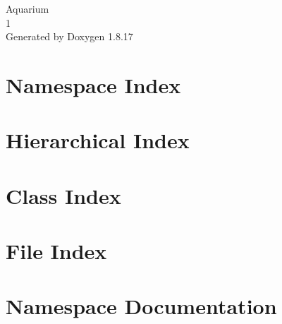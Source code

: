 \let\mypdfximage\pdfximage\def\pdfximage{\immediate\mypdfximage}\documentclass[twoside]{book}
\newcommand{\+}{\discretionary{\mbox{\scriptsize$\hookleftarrow$}}{}{}}
\newcommand{\clearemptydoublepage}{%
  \newpage{\pagestyle{empty}\cleardoublepage}%
}
\begin{document}
\hypersetup{pageanchor=false,
             bookmarksnumbered=true,
             pdfencoding=unicode
            }
\begin{titlepage}
\vspace*{7cm}
\begin{center}%
{\Large Aquarium \\[1ex]\large 1 }\\
\vspace*{1cm}
{\large Generated by Doxygen 1.8.17}\\
\end{center}
\end{titlepage}
\clearemptydoublepage
{}
\tableofcontents
\clearemptydoublepage
{}
\hypersetup{pageanchor=true}

\chapter{Namespace Index}

\chapter{Hierarchical Index}

\chapter{Class Index}

\chapter{File Index}

\chapter{Namespace Documentation}


\end{document}
